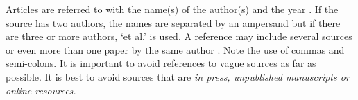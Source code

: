 Articles are referred to with the name(s) of the author(s) and the year \citep{dawkins76}. If the source has two authors, the names are separated by an ampersand \citep{berrah99} but if there are three or more authors, ‘et al.’ is used\citep{schwartz97}. A reference may include several sources \citep{cooper52, Crothers78} or even more than one paper by the same author \citep{Kirby98, Kirby99, Kirby00, Oliphant93, Oliphant96}. Note the use of commas and semi-colons.
It is important to avoid references to vague sources as far as possible. It is best to avoid sources that are \textit{in press, unpublished manuscripts or online resources.}